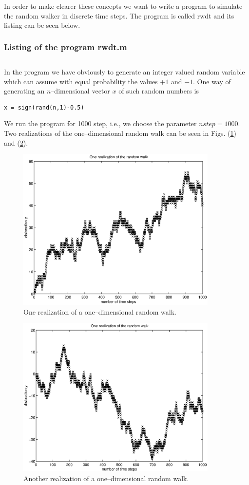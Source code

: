 In order to make clearer these concepts we want to write a program 
to simulate the random walker in discrete time steps. The program
is called {\sf rwdt} and its listing can be seen below.

\subsubsection{Listing of the program rwdt.m}
\begin{verbatim}

\end{verbatim}

In the program we have obviously to generate an integer valued random 
variable which can assume with equal probability the values $+1$ 
and $-1$. One way of generating an $n$--dimensional vector $x$ of 
such random numbers is
\begin{verbatim}
x = sign(rand(n,1)-0.5)
\end{verbatim}
We run the program for 1000 step, i.e., we choose the parameter 
$nstep=1000$.
Two realizations of the one--dimensional random walk can be seen 
in Figs. (\ref{F_RWDT_1}) and (\ref{F_RWDT_2}). 
\begin{figure}
\label{F_RWDT_1}
\includegraphics[width=10cm]{./Figures/f_rwdt_1.eps}
\caption{One realization of a one--dimensional random walk.}
\end{figure}

\begin{figure}
\label{F_RWDT_2}
\includegraphics[width=10cm]{./Figures/f_rwdt_2.eps}
\caption{Another realization of a one--dimensional random walk.}
\end{figure}

